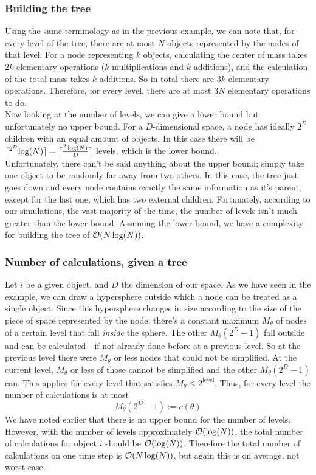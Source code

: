 \subsubsection*{Building the tree} Using the same terminology as in the previous example, we can note that, for every level of the tree, there are at most $N$ objects represented by the nodes of that level. For a node representing $k$ objects, calculating the center of mass takes $2k$ elementary operations ($k$ multiplications and $k$ additions), and the calculation of the total mass takes $k$ additions. So in total there are $3k$ elementary operations. Therefore, for every level, there are at most $3N$ elementary operations to do.\\
Now looking at the number of levels, we can give a lower bound but unfortunately no upper bound. For a $D$-dimensional space, a node has ideally $2^D$ children with an equal amount of objects. In this case there will be $\lceil ^{2^D} \log(N) \rceil = \lceil \frac{^2\log(N)}{D} \rceil$ levels, which is the lower bound.\\
Unfortunately, there can't be said anything about the upper bound; simply take one object to be randomly far away from two others. In this case, the tree just goes down and every node contains exactly the same information as it's parent, except for the last one, which has two external children. Fortunately, according to our simulations, the vast majority of the time, the number of levels isn't much greater than the lower bound. Assuming the lower bound, we have a complexity for building the tree of $\mathcal{O}(N\log(N))$.
\subsubsection*{Number of calculations, given a tree} Let $i$ be a given object, and $D$ the dimension of our space. As we have seen in the example, we can draw a hypersphere outside which a node can be treated as a single object. Since this hypersphere changes in size according to the size of the piece of space represented by the node, there's a constant maximum $M_\theta$ of nodes of a certain level that fall \textit{inside} the sphere. The other $M_\theta(2^D-1)$ fall outside and can be calculated - if not already done before at a previous level. So at the previous level there were $M_\theta$ or less nodes that could not be simplified. At the current level, $M_\theta$ or less of those cannot be simplified and the other $M_\theta(2^D-1)$ can. This applies for every level that satisfies $M_\theta \leq 2^{\text{level}}$. Thus, for every level the number of calculations is at most
\[
M_\theta (2^D-1) := c(\theta)
\]
We have noted earlier that there is no upper bound for the number of levels. However, with the number of levels approximately $\mathcal{O}(\log(N))$, the total number of calculations for object $i$ should be $\mathcal{O}(\log(N))$. Therefore the total number of calculations on one time step is $\mathcal{O}(N\log(N))$, but again this is on average, not worst case.
